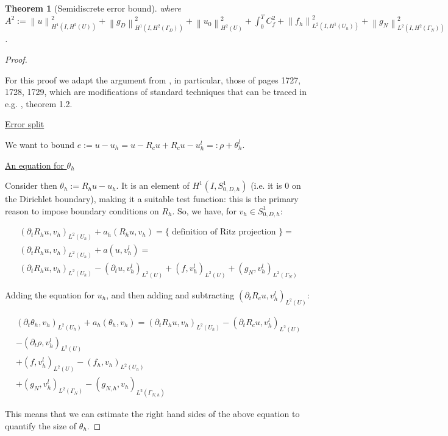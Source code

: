 \documentclass[english,a4paper,10pt,oneside]{scrbook}	%
\theoremstyle{break}
\newtheorem{thm}[equation]{Theorem}
\newenvironment{mproof}[1][\proofname]{%
  \begin{proof}[#1]$ $\par\nobreak\ignorespaces
}{%
  \end{proof}
}
\renewcommand*{\proofname}{Proof}
\theoremstyle{remark}
\newcommand{\ds}{\displaystyle}
\newcommand{\norm}[1]{\left\lVert#1\right\rVert}
\newcommand{\ind}[1]{\{\text{ #1 }\}}
\begin{document}
\begin{appendices}
\begin{thm}[Semidiscrete error bound]
where $A^2:= \ds \norm{u}_{H^1(I,H^2(U))}^2 + \norm{g_D}_{H^1(I,H^2(\Gamma_D))}^2 + \norm{u_0}_{H^2(U)}^2 +  \int_0^T C_f^2+ \norm{f_h}_{L^2(I,H^1(U_h))}^2 + \norm{g_N}_{L^2(I,H^2(\Gamma_N))}^2 $.

\end{thm}

\begin{mproof}

For this proof we adapt the argument from \cite{ranner}, in particular, those of pages 1727, 1728, 1729, which are modifications of standard techniques that can be traced in e.g. \cite{thomee}, theorem 1.2.

\underline{Error split}

We want to bound $e:=u-u_h = u-R_cu +R_c u -u_h^l =: \rho + \theta_h^l$.

\underline{An equation for $\theta_h$}

Consider then $\theta_h := R_h u -u_h$. It is an element of $H^1(I,S^1_{0,D,h})$ (i.e. it is $0$ on the Dirichlet boundary), making it a suitable test function: this is the primary reason to impose boundary conditions on $R_h$.
So, we have, for $v_h \in S^1_{0,D,h}$:

\begin{align*}
(\partial_t R_h u , v_h)_{L^2(U_h)} + a_h(R_h u, v_h) = \ind{definition of Ritz projection}=\\
(\partial_t R_h u , v_h)_{L^2(U_h)} + a(u, v_h^l) =\\
(\partial_t R_h u , v_h)_{L^2(U_h)} - (\partial_t u, v_h^l)_{L^2(U)} + (f, v_h^l)_{L^2(U)} + (g_{N}, v_h^l)_{L^2(\Gamma_{N})} 
\end{align*}

Adding the equation for $u_h$, and then adding and subtracting $(\partial_t R_cu, v_h^l)_{L^2(U)}$:


\begin{align}
\label{eqn:theta}
(\partial_t \theta_h , v_h)_{L^2(U_h)} + a_h(\theta_h, v_h) = 
(\partial_t R_h u , v_h)_{L^2(U_h)} - (\partial_t R_c u , v_h^l)_{L^2(U)}\\
- (\partial_t \rho, v_h^l)_{L^2(U)}\\ + (f, v_h^l)_{L^2(U)} - (f_h, v_h)_{L^2(U_h)}\\ + (g_{N}, v_h^l)_{L^2(\Gamma_{N})} - (g_{N,h}, v_h)_{L^2(\Gamma_{N,h})} 
\end{align}

This means that we can estimate the right hand sides of the above equation to quantify the size of $\theta_h$.


\end{mproof}
\end{appendices}
\end{document}
